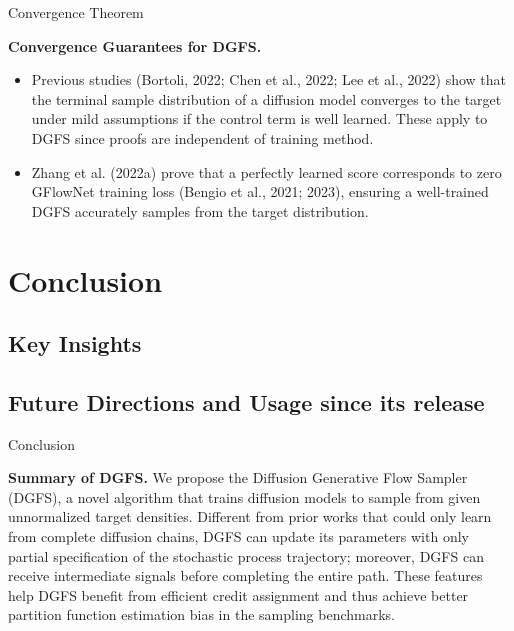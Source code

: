 \documentclass[aspectratio=169,xcolor=dvipsnames]{beamer}
\begin{document}
\begin{frame}[t]{Convergence Theorem}
\footnotesize

\textbf{Convergence Guarantees for DGFS.}
\begin{itemize}\itemsep2pt
  \item Previous studies (Bortoli, 2022; Chen et al., 2022; Lee et al., 2022) show that the terminal sample distribution of a diffusion model converges to the target under mild assumptions if the control term is well learned. These apply to DGFS since proofs are independent of training method.
  \item Zhang et al. (2022a) prove that a perfectly learned score corresponds to zero GFlowNet training loss (Bengio et al., 2021; 2023), ensuring a well-trained DGFS accurately samples from the target distribution.
\end{itemize}

\end{frame}



\section{Conclusion}

\subsection{Key Insights}

\subsection{Future Directions and Usage since its release}

\begin{frame}{Conclusion}
\footnotesize

\textbf{Summary of DGFS.} We propose the Diffusion Generative Flow Sampler (DGFS), a novel algorithm that trains diffusion models to sample from given unnormalized target densities. Different from prior works that could only learn from complete diffusion chains, DGFS can update its parameters with only partial specification of the stochastic process trajectory; moreover, DGFS can receive intermediate signals before completing the entire path. These features help DGFS benefit from efficient credit assignment and thus achieve better partition function estimation bias in the sampling benchmarks.

\end{frame}
\end{document}
